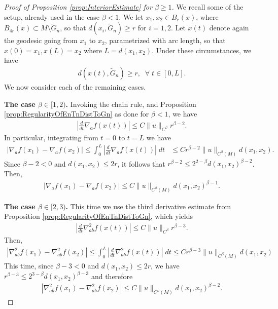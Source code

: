 \documentclass[11pt,reqno]{amsart}
\numberwithin{equation}{section}
\theoremstyle{plain}
\begin{document}
\begin{proof}[Proof of Proposition \ref{prop:InteriorEstimate} for $\beta \geq 1$]
  We recall some of the setup, already used in the case $\beta<1$. We let $x_1,x_2 \in B_r(x)$, where $B_{4r}(x)\subset M \setminus \tilde G_n$, so that $d(x_i,\tilde G_n)\geq r$ for $i=1,2$. Let $x(t)$ denote again the geodesic going from $x_1$ to $x_2$, parametrized with arc length, so that $x(0)=x_1,x(L)=x_2$ where $L=d(x_1,x_2)$. Under these circumstances, we have
  \begin{align*}
    d(x(t),\tilde G_n) \geq r,\;\;\forall\;t\in[0,L].    	    
  \end{align*}	  
  We now consider each of the remaining cases.

  \textbf{The case $\beta \in [1,2)$.}  
  Invoking the chain rule, and Proposition \ref{prop:RegularityOfEnTnDistToGn} as done for $\beta<1$, we have
  \begin{align*}
    \left |\frac{d}{dt}\nabla_a f(x(t)) \right | \leq C\|u\|_{C^\beta}r^{\beta-2}. 
  \end{align*}
  In particular, integrating from $t=0$ to $t=L$ we have
  \begin{align*}
    |\nabla_af(x_1) -\nabla_af(x_2)|  \leq \int_0^L \left | \frac{d}{dt}\nabla_a f(x(t)) \right |\;dt & \leq Cr^{\beta-2}\|u\|_{C^\beta(M)} d(x_1,x_2).
  \end{align*}  
  Since $\beta-2<0$ and $d(x_1,x_2)\leq 2r$, it follows that $r^{\beta-2}\leq 2^{2-\beta}d(x_1,x_2)^{\beta-2}$. Then,
  \begin{align*}
    |\nabla_af(x_1) -\nabla_af(x_2)|  \leq C\|u\|_{C^\beta(M)} d(x_1,x_2)^{\beta-1}.
  \end{align*}  


  \textbf{The case $\beta \in [2,3)$.} This time we use the third derivative estimate from Proposition \ref{prop:RegularityOfEnTnDistToGn}, which yields
  \begin{align*}
    \left |\frac{d}{dt}\nabla_{ab}^2 f(x(t)) \right | \leq C\|u\|_{C^\beta}r^{\beta-3}. 
  \end{align*}
  Then, 
  \begin{align*}
    |\nabla^{2}_{ab}f(x_1)-\nabla^{2}_{ab}f(x_2)| \leq \int_0^L \left | \frac{d}{dt}\nabla^{2}_{ab}f(x(t)) \right |\;dt \leq Cr^{\beta-3}\|u\|_{C^\beta(M)}d(x_1,x_2)
  \end{align*}	
 This time, since $\beta-3<0$ and $d(x_1,x_2)\leq 2r$, we have $r^{\beta-3}\leq 2^{3-\beta}d(x_1,x_2)^{\beta-3}$ and therefore
  \begin{align*}
    |\nabla^{2}_{ab}f(x_1)-\nabla^{2}_{ab}f(x_2)| \leq C\|u\|_{C^\beta(M)}d(x_1,x_2)^{\beta-2}.
  \end{align*}	
 


\end{proof}
\end{document}
